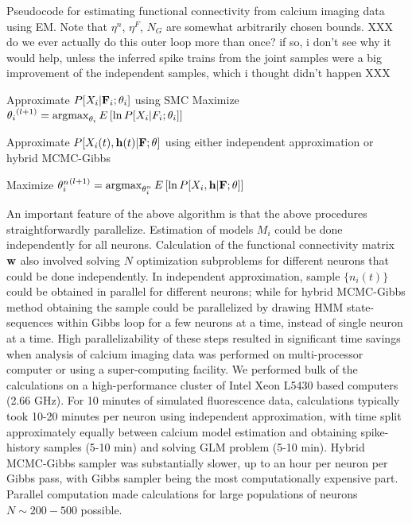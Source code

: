 \begin{algorithm}
\caption{Pseudocode for estimating functional connectivity from calcium imaging data using EM. Note that $\eta^n$, $\eta^F$, $N_G$ are somewhat arbitrarily chosen bounds.  XXX do we ever actually do this outer loop more than once? if so, i don't see why it would help, unless the inferred spike trains from the joint samples were a big improvement of the independent samples, which i thought didn't happen XXX}
\label{eqn:pseudocode}
\begin{algorithmic}
      \State Approximate $P[X_i|{\bf F}_i; \mathbf{\theta}_i]$ using SMC
      \State Maximize ${\mathbf{\theta}_i}^{(l+1)}=\operatorname*{argmax}_{\mathbf{\theta}_i} E\left[\ln P[X_i | F_i; \mathbf{\theta}_i] \right]$
    \EndWhile
  \EndFor
  
      \State Approximate $P[X_i(t), \mathbf{h}(t) |{\bf F}; \mathbf{\theta}]$ using either independent approximation or hybrid MCMC-Gibbs
    \EndFor

  	\State Maximize ${\mathbf{\theta}^n_i}^{(l+1)}=\operatorname*{argmax}_{\mathbf{\theta}^n_i} E\left[\ln P[X_i, \mathbf{h} | {\bf F}; \mathbf{\theta}]\right]$  
  \EndFor

\EndWhile
\end{algorithmic}
\end{algorithm}


An important feature of the above algorithm is that the above procedures straightforwardly parallelize. Estimation of models $M_i$ could be done independently for all neurons. Calculation of the functional connectivity matrix $\mathbf{w}$ also involved solving $N$ optimization subproblems for different neurons that could be done independently. In independent approximation, sample $\{ n_i(t)\}$ could be obtained in parallel for different neurons; while for hybrid MCMC-Gibbs method obtaining the sample could be parallelized by drawing HMM state-sequences within Gibbs loop for a few neurons at a time, instead of single neuron at a time. High parallelizability of these steps resulted in significant time savings when analysis of calcium imaging data was performed on multi-processor computer or using a super-computing facility.  We performed bulk of the calculations on a high-performance cluster of Intel Xeon L5430 based computers (2.66 GHz). For 10 minutes of simulated fluorescence data, calculations typically took 10-20 minutes per neuron using independent approximation, with time split approximately equally between calcium model estimation and obtaining spike-history samples (5-10 min) and solving GLM problem (5-10 min). Hybrid MCMC-Gibbs sampler was substantially slower, up to an hour per neuron per Gibbs pass, with Gibbs sampler being the most computationally expensive part. Parallel computation made calculations for large populations of neurons $N\sim 200-500$ possible.

